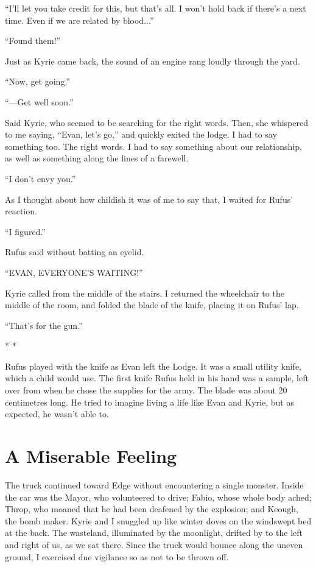 \documentclass[oneside]{book}
\begin{document}
“I’ll let you take credit for this, but that’s all. I won’t hold back if there’s a next time. Even if we are related by blood...”

“Found them!”

Just as Kyrie came back, the sound of an engine rang loudly through the yard.

“Now, get going.”

“—Get well soon.”

Said Kyrie, who seemed to be searching for the right words. Then, she whispered to me saying, “Evan, let’s go,” and quickly exited the lodge. I had to say something too. The right words. I had to say something about our relationship, as well as something along the lines of a farewell.

“I don’t envy you.”

As I thought about how childish it was of me to say that, I waited for Rufus’ reaction.

“I figured.”

Rufus said without batting an eyelid.

“EVAN, EVERYONE’S WAITING!”

Kyrie called from the middle of the stairs. I returned the wheelchair to the middle of the room, and folded the blade of the knife, placing it on Rufus’ lap.

“That’s for the gun.”

* *

Rufus played with the knife as Evan left the Lodge. It was a small utility knife, which a child would use. The first knife Rufus held in his hand was a sample, left over from when he chose the supplies for the army. The blade was about 20 centimetres long. He tried to imagine living a life like Evan and Kyrie, but as expected, he wasn’t able to.

\chapter{A Miserable Feeling}
The truck continued toward Edge without encountering a single monster. Inside the car was the Mayor, who volunteered to drive; Fabio, whose whole body ached; Throp, who moaned that he had been deafened by the explosion; and Keough, the bomb maker. Kyrie and I snuggled up like winter doves on the windswept bed at the back. The wasteland, illuminated by the moonlight, drifted by to the left and right of us, as we sat there. Since the truck would bounce along the uneven ground, I exercised due vigilance so as not to be thrown off.
\end{document}
